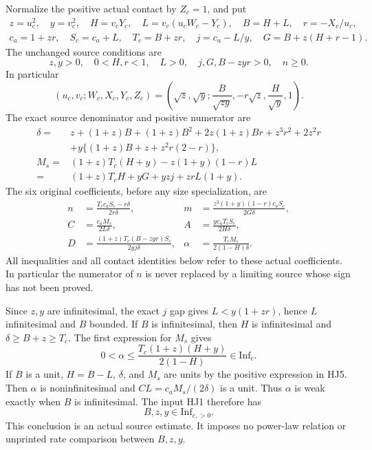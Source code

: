 Normalize the positive actual contact by \(Z_c=1\), and put
\[
\begin{gathered}
 z=u_c^2,\quad y=v_c^2,\quad H=v_cY_c,\quad
 L=v_c(u_cW_c-Y_c),\quad B=H+L,\quad r=-X_c/u_c,\\
 c_a=1+zr,\quad S_c=c_a+L,\quad T_c=B+zr,\quad
 j=c_a-L/y,\quad G=B+z(H+r-1).
\end{gathered}
\tag{HJ4}
\]
The unchanged source conditions are
\[
 z,y>0,\quad 0<H,r<1,\quad L>0,\quad
 j,G,B-zyr>0,\quad n\geq0 .
\]
In particular
\[
 (u_c,v_c;W_c,X_c,Y_c,Z_c)
 =\left(\sqrt z,\sqrt y;\frac{B}{\sqrt{zy}},
                  -r\sqrt z,\frac H{\sqrt y},1\right).
\]
The exact source denominator and positive numerator are
\[
\begin{split}
 \delta={}&z+(1+z)B+(1+z)B^2+2z(1+z)Br
                       +z^3r^2+2z^2r\\
 &+y\{(1+z)B+z+z^2r(2-r)\},\\
 M_s={}&(1+z)T_c(H+y)-z(1+y)(1-r)L\\
     ={}&(1+z)T_cH+yG+yzj+zrL(1+y).
\end{split}
\tag{HJ5}
\]
The six original coefficients, before any size specialization, are
\[
\begin{aligned}
 n&=\frac{T_cc_aS_c-r\delta}{2r\delta},&
 m&=\frac{z^2(1+y)(1-r)c_aS_c}{2G\delta},\\
 C&=\frac{c_aM_s}{2L\delta},&
 A&=\frac{yc_aT_cS_c}{2H\delta},\\
 D&=\frac{(1+z)T_c(B-zyr)S_c}{2yj\delta},&
 \alpha&=\frac{T_cM_s}{2(1-H)\delta}.
\end{aligned}
\tag{HJ6}
\]
All inequalities and all contact identities below refer
to these actual coefficients.  In particular the
numerator of \(n\) is never replaced by a limiting
source whose sign has not been proved.

Since \(z,y\) are infinitesimal, the exact \(j\) gap gives
\(L<y(1+zr)\), hence \(L\) infinitesimal and \(B\)
bounded.  If \(B\) is infinitesimal, then \(H\) is
infinitesimal and \(\delta\geq B+z\geq T_c\).
The first expression for \(M_s\) gives
\[
 0<\alpha
 \leq\frac{T_c(1+z)(H+y)}{2(1-H)}
 \in\mathrm{Inf}_c.
 \tag{HJ7}
\]
If \(B\) is a unit, \(H=B-L\), \(\delta\), and \(M_s\)
are units by the positive expression in HJ5.
Then \(\alpha\) is noninfinitesimal and
\(CL=c_aM_s/(2\delta)\) is a unit.
Thus \(\alpha\) is weak exactly when \(B\) is
infinitesimal.  The input HJ1 therefore has
\[
 B,z,y\in\mathrm{Inf}_{c,>0}.
 \tag{HJ8}
\]
This conclusion is an actual source estimate.
It imposes no power-law relation or unprinted rate
comparison between \(B,z,y\).

